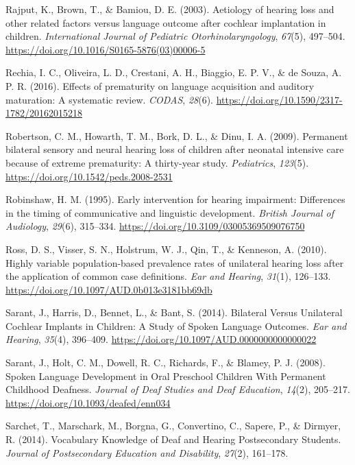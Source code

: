 \documentclass[english,man]{apa6}
\begin{document}
\leavevmode\hypertarget{ref-rajput2003}{}%
Rajput, K., Brown, T., \& Bamiou, D. E. (2003). Aetiology of hearing loss and other related factors versus language outcome after cochlear implantation in children. \emph{International Journal of Pediatric Otorhinolaryngology}, \emph{67}(5), 497--504. \url{https://doi.org/10.1016/S0165-5876(03)00006-5}

\leavevmode\hypertarget{ref-rechia2016}{}%
Rechia, I. C., Oliveira, L. D., Crestani, A. H., Biaggio, E. P. V., \& de Souza, A. P. R. (2016). Effects of prematurity on language acquisition and auditory maturation: A systematic review. \emph{CODAS}, \emph{28}(6). \url{https://doi.org/10.1590/2317-1782/20162015218}

\leavevmode\hypertarget{ref-robertson2009}{}%
Robertson, C. M., Howarth, T. M., Bork, D. L., \& Dinu, I. A. (2009). Permanent bilateral sensory and neural hearing loss of children after neonatal intensive care because of extreme prematurity: A thirty-year study. \emph{Pediatrics}, \emph{123}(5). \url{https://doi.org/10.1542/peds.2008-2531}

\leavevmode\hypertarget{ref-robinshaw1995}{}%
Robinshaw, H. M. (1995). Early intervention for hearing impairment: Differences in the timing of communicative and linguistic development. \emph{British Journal of Audiology}, \emph{29}(6), 315--334. \url{https://doi.org/10.3109/03005369509076750}

\leavevmode\hypertarget{ref-ross2010}{}%
Ross, D. S., Visser, S. N., Holstrum, W. J., Qin, T., \& Kenneson, A. (2010). Highly variable population-based prevalence rates of unilateral hearing loss after the application of common case definitions. \emph{Ear and Hearing}, \emph{31}(1), 126--133. \url{https://doi.org/10.1097/AUD.0b013e3181bb69db}

\leavevmode\hypertarget{ref-sarant2014}{}%
Sarant, J., Harris, D., Bennet, L., \& Bant, S. (2014). Bilateral Versus Unilateral Cochlear Implants in Children: A Study of Spoken Language Outcomes. \emph{Ear and Hearing}, \emph{35}(4), 396--409. \url{https://doi.org/10.1097/AUD.0000000000000022}

\leavevmode\hypertarget{ref-sarant2008}{}%
Sarant, J., Holt, C. M., Dowell, R. C., Richards, F., \& Blamey, P. J. (2008). Spoken Language Development in Oral Preschool Children With Permanent Childhood Deafness. \emph{Journal of Deaf Studies and Deaf Education}, \emph{14}(2), 205--217. \url{https://doi.org/10.1093/deafed/enn034}

\leavevmode\hypertarget{ref-sarchet2014}{}%
Sarchet, T., Marschark, M., Borgna, G., Convertino, C., Sapere, P., \& Dirmyer, R. (2014). Vocabulary Knowledge of Deaf and Hearing Postsecondary Students. \emph{Journal of Postsecondary Education and Disability}, \emph{27}(2), 161--178.
\end{document}
